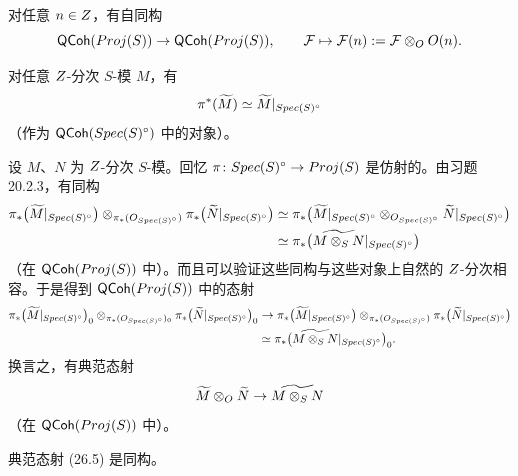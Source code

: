 \begin{corollary}\label{cor:26.2.3}
对任意 $n \in Z$，有自同构
\[
\mathsf{QCoh}(Proj(S)) \to \mathsf{QCoh}(Proj(S)), \qquad \mathcal{F} \mapsto \mathcal{F}(n) := \mathcal{F} \otimes_O O(n).
\]
\end{corollary}

\begin{exercise}\label{exc:26.2.4}
对任意 $Z$-分次 $S$-模 $M$，有
\[
\pi^*(\widetilde{M}) \simeq \widetilde{M}|_{Spec(S)^{\circ}}
\]
（作为 $\mathsf{QCoh}(Spec(S)^{\circ})$ 中的对象）。
\end{exercise}

\begin{construction}\label{con:26.2.5}
设 $M$、$N$ 为 $Z$-分次 $S$-模。回忆 $\pi \colon Spec(S)^{\circ} \to Proj(S)$ 是仿射的。由习题 20.2.3，有同构
\begin{equation}\label{eq:26.3}
\begin{aligned}
\pi_*\bigl(\widetilde{M}|_{Spec(S)^{\circ}}\bigr) \otimes_{\pi_*(O_{Spec(S)^{\circ}})} \pi_*\bigl(\widetilde{N}|_{Spec(S)^{\circ}}\bigr)
&\simeq \pi_*\bigl(\widetilde{M}|_{Spec(S)^{\circ}} \otimes_{O_{Spec(S)^{\circ}}} \widetilde{N}|_{Spec(S)^{\circ}}\bigr)\\
&\simeq \pi_*\bigl(\widetilde{M \otimes_S N}|_{Spec(S)^{\circ}}\bigr)
\end{aligned}
\end{equation}
（在 $\mathsf{QCoh}(Proj(S))$ 中）。而且可以验证这些同构与这些对象上自然的 $Z$-分次相容。于是得到 $\mathsf{QCoh}(Proj(S))$ 中的态射
\begin{equation}\label{eq:26.4}
\begin{aligned}
\pi_*\bigl(\widetilde{M}|_{Spec(S)^{\circ}}\bigr)_0 \otimes_{\pi_*(O_{Spec(S)^{\circ}})_0} \pi_*\bigl(\widetilde{N}|_{Spec(S)^{\circ}}\bigr)_0
&\to \pi_*\bigl(\widetilde{M}|_{Spec(S)^{\circ}}\bigr) \otimes_{\pi_*(O_{Spec(S)^{\circ}})} \pi_*\bigl(\widetilde{N}|_{Spec(S)^{\circ}}\bigr)\\
&\simeq \pi_*\bigl(\widetilde{M \otimes_S N}|_{Spec(S)^{\circ}}\bigr)_0.
\end{aligned}
\end{equation}
换言之，有典范态射
\begin{equation}\label{eq:26.5}
\widetilde{M} \otimes_O \widetilde{N} \to \widetilde{M \otimes_S N}
\end{equation}
（在 $\mathsf{QCoh}(Proj(S))$ 中）。
\end{construction}

\begin{lemma}\label{lem:26.2.6}
典范态射 (26.5) 是同构。
\end{lemma}

